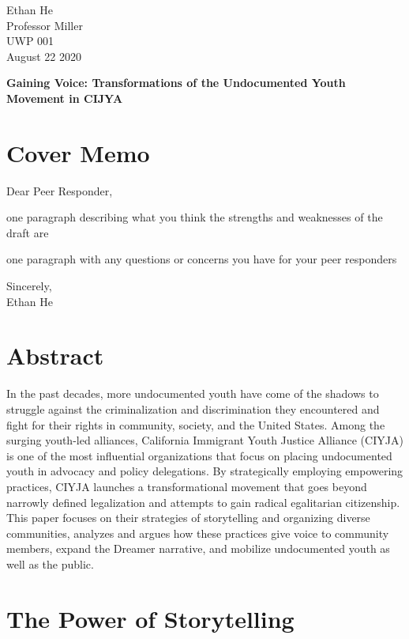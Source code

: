 \documentclass[12pt]{article}
\begin{document}
\begin{flushleft}

Ethan He \\
Professor Miller \\
UWP 001 \\
August 22 2020 \\

\begin{center}
    \textbf{Gaining Voice: Transformations of the Undocumented Youth Movement in CIJYA}
\end{center}

\setlength{\parindent}{0.5in}

\section*{Cover Memo}

\noindent
Dear Peer Responder,

one paragraph describing what you think the strengths and weaknesses of the draft are

one paragraph with any questions or concerns you have for your peer responders

\noindent
Sincerely, \\
\noindent
Ethan He

\section{Abstract}

In the past decades, more undocumented youth have come of the shadows to struggle against the criminalization and discrimination they encountered and fight for their rights in community, society, and the United States. 
Among the surging youth-led alliances, California Immigrant Youth Justice Alliance (CIYJA) is one of the most influential organizations that focus on placing undocumented youth in advocacy and policy delegations. 
By strategically employing empowering practices, CIYJA launches a transformational movement that goes beyond narrowly defined legalization and attempts to gain radical egalitarian citizenship.
This paper focuses on their strategies of storytelling and organizing diverse communities, analyzes and argues how these practices give voice to community members, expand the Dreamer narrative, and mobilize undocumented youth as well as the public.

\section{The Power of Storytelling}


\end{flushleft}
\end{document}
